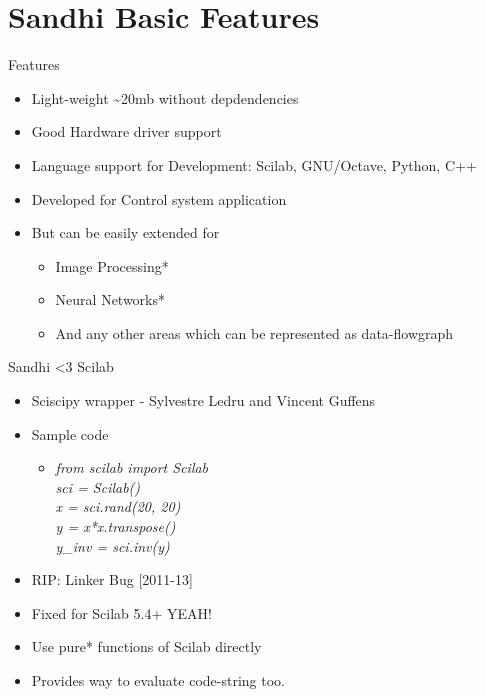 \documentclass{beamer}
\begin{document}
\section{Sandhi Basic Features}
\begin{frame}{Features}

\begin{itemize}
  \item Light-weight \textasciitilde 20mb without depdendencies
  \item Good Hardware driver support
  \item Language support for Development: Scilab, GNU/Octave, Python, C++
  \item Developed for Control system application
  \item But can be easily extended for
  \begin{itemize}
  	\item Image Processing*
	\item Neural Networks*
	\item And any other areas which can be represented as data-flowgraph
  \end{itemize}
\end{itemize}
\vskip 1cm
\end{frame}



\begin{frame}{Sandhi \textless3 Scilab}

\begin{itemize}
  \item Sciscipy wrapper - Sylvestre Ledru and Vincent Guffens
  \item Sample code
  \begin{itemize}\item \textit{from scilab import Scilab 
                \\  sci = Scilab()
                \\  x = sci.rand(20, 20)
                \\  y = x*x.transpose()
                \\  y\_inv = sci.inv(y)}
  \end{itemize}
  \item RIP: Linker Bug [2011-13]
  \item Fixed for Scilab 5.4+  YEAH!
  \item Use pure* functions of Scilab directly
  \item Provides way to evaluate code-string too.
\end{itemize}
\vskip 1cm
\end{frame}
\end{document}
